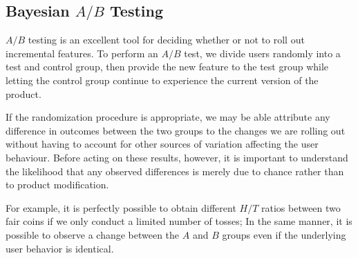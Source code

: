 \subsection{Bayesian $A/B$ Testing}
$A/B$ testing is an excellent tool for deciding whether or not to roll out incremental features.  To perform an $A/B$ test, we divide users randomly into a test and control group, then provide the new feature to the test group while letting the control group continue to experience the current version of the product. \par If the randomization procedure is appropriate, we may be able attribute any difference in outcomes between the two groups to the changes we are rolling out without having to account for other sources of variation affecting the user behaviour. Before acting on these results, however, it is important to understand the likelihood that any observed differences is merely due to chance rather than to product modification. \par For example, it is perfectly possible to obtain different $H/T$ ratios between two fair coins if we only conduct a limited number of tosses; In the same manner, it is possible to observe a change between the $A$ and $B$ groups even if the underlying user behavior is identical.
